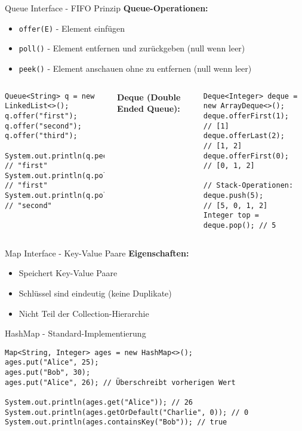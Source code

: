 \begin{frame}[fragile]{Queue Interface - FIFO Prinzip}
  \textbf{Queue-Operationen:}
  \begin{itemize}
    \item \texttt{offer(E)} - Element einfügen
    \item \texttt{poll()} - Element entfernen und zurückgeben (null wenn leer)
    \item \texttt{peek()} - Element anschauen ohne zu entfernen (null wenn leer)
  \end{itemize}

  \begin{columns}[T]
    \begin{lstlisting}[style=java, basicstyle=\footnotesize\ttfamily]
Queue<String> q = new LinkedList<>();
q.offer("first");
q.offer("second");
q.offer("third");

System.out.println(q.peek()); // "first"
System.out.println(q.poll()); // "first"
System.out.println(q.poll()); // "second"
    \end{lstlisting}

    \textbf{Deque (Double Ended Queue):}
    \begin{lstlisting}[style=java, basicstyle=\footnotesize\ttfamily]
Deque<Integer> deque = new ArrayDeque<>();
deque.offerFirst(1);  // [1]
deque.offerLast(2);   // [1, 2]
deque.offerFirst(0);  // [0, 1, 2]

// Stack-Operationen:
deque.push(5);        // [5, 0, 1, 2]
Integer top = deque.pop(); // 5
    \end{lstlisting}
  \end{columns}
\end{frame}

\begin{frame}[fragile]{Map Interface - Key-Value Paare}
  \textbf{Eigenschaften:}
  \begin{itemize}
    \item Speichert Key-Value Paare
    \item Schlüssel sind eindeutig (keine Duplikate)
    \item Nicht Teil der Collection-Hierarchie
  \end{itemize}

  \begin{exampleblock}{HashMap - Standard-Implementierung}
    \begin{lstlisting}[style=java, basicstyle=\footnotesize\ttfamily]
Map<String, Integer> ages = new HashMap<>();
ages.put("Alice", 25);
ages.put("Bob", 30);
ages.put("Alice", 26); // Überschreibt vorherigen Wert

System.out.println(ages.get("Alice")); // 26
System.out.println(ages.getOrDefault("Charlie", 0)); // 0
System.out.println(ages.containsKey("Bob")); // true
    \end{lstlisting}
  \end{exampleblock}
\end{frame}

